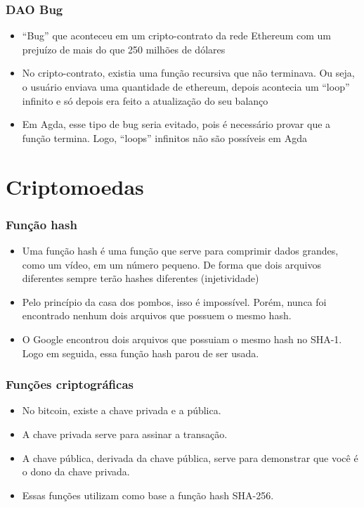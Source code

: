 \documentclass{beamer}
\begin{document}
\begin{frame}
  \frametitle{DAO Bug}
  \begin{itemize}
    \item \foreignquote{english}{Bug} que aconteceu em um cripto-contrato da rede Ethereum com um prejuízo de mais do que 250 milhões de dólares
      \cite{wood2014ethereum}
    \item No cripto-contrato, existia uma função recursiva que não terminava.
      Ou seja, o usuário enviava uma quantidade de ethereum,
      depois acontecia um \foreignquote{english}{loop} infinito e só depois era feito a atualização do seu balanço
    \item Em Agda, esse tipo de bug seria evitado, pois é necessário provar que a função termina.
      Logo, \foreignquote{english}{loops} infinitos não são possíveis em Agda
  \end{itemize}
\end{frame}

\section{Criptomoedas}
\begin{frame}
  \frametitle{Função hash}
  \begin{itemize}
    \item Uma função hash é uma função que serve para comprimir dados grandes, como um vídeo,
      em um número pequeno.
      De forma que dois arquivos diferentes sempre terão hashes diferentes (injetividade)
    \item Pelo princípio da casa dos pombos, isso é impossível.
      Porém, nunca foi encontrado nenhum dois arquivos que possuem o mesmo hash.
    \item O Google encontrou dois arquivos que possuiam o mesmo hash no SHA-1.
      Logo em seguida, essa função hash parou de ser usada.
  \end{itemize}
\end{frame}

\begin{frame}
  \frametitle{Funções criptográficas}
  \begin{itemize}
    \item No bitcoin, existe a chave privada e a pública.
    \item A chave privada serve para assinar a transação.
    \item A chave pública, derivada da chave pública,
      serve para demonstrar que você é o dono da chave privada.
    \item Essas funções utilizam como base a função hash SHA-256.
  \end{itemize}
\end{frame}
\end{document}
